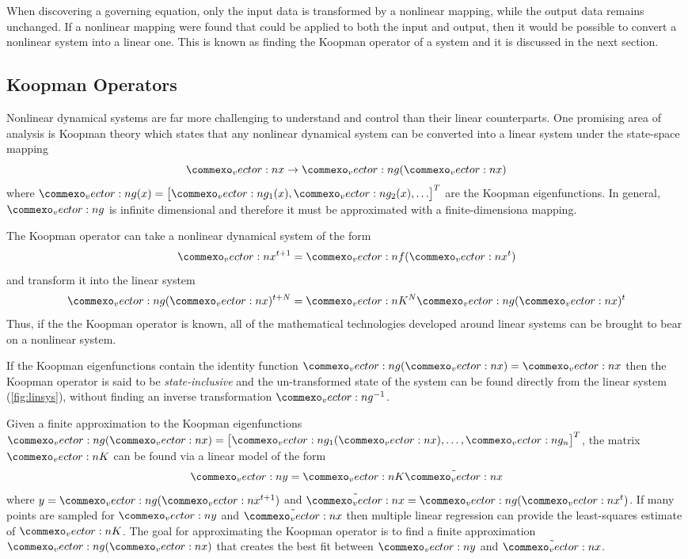 \documentclass{article}
\renewcommand{\vec}[1]{\vect{#1}}
\newcommand{\mat}[1]{\vect{#1}}
\begin{document}
When discovering a governing equation, only the input data is transformed by a nonlinear mapping, while the output data remains unchanged. If a nonlinear mapping were found that could be applied to both the input and output, then it would be possible to convert a nonlinear system into a linear one. This is known as finding the Koopman operator of a system and it is discussed in the next section.

\subsection{Koopman Operators}
Nonlinear dynamical systems are far more challenging to understand and control than their linear counterparts. One promising area of analysis is Koopman theory \cite{korda2018linear} which states that any nonlinear dynamical system can be converted into a linear system under the state-space mapping
\begin{equation}
\vec{x} \rightarrow \vec{g}(\vec{x})
\end{equation}
where $\vec{g}(x) = \begin{bmatrix} \vec{g}_1(x), \vec{g}_2(x), \ldots \end{bmatrix}^T$ are the Koopman eigenfunctions. In general, $\vec{g}$ is infinite dimensional and therefore it must be approximated with a finite-dimensiona mapping.

The Koopman operator can take a nonlinear dynamical system of the form
\begin{equation}
\vec{x}^{t+1} = \vec{f}(\vec{x}^t)
\end{equation}
and transform it into the linear system
\begin{equation}
\label{fig:linsys}
\vec{g}(\vec{x})^{t+N} = \mat{K}^N \vec{g}(\vec{x})^{t}
\end{equation}
Thus, if the the Koopman operator is known, all of the mathematical technologies developed around linear systems can be brought to bear on a nonlinear system. 

If the Koopman eigenfunctions contain the identity function $\vec{g}(\vec{x}) = \vec{x}$ then the Koopman operator is said to be \emph{state-inclusive} and the un-transformed state of the system can be found directly from the linear system (\cref{fig:linsys}), without finding an inverse transformation $\vec{g}^{-1}$.

Given a finite approximation to the Koopman eigenfunctions $\vec{g}(\vec{x}) = \begin{bmatrix} \vec{g}_1(\vec{x}), \ldots, \vec{g}_n \end{bmatrix}^T$, the matrix $\mat{K}$ can be found via a linear model of the form 
\begin{equation}
\vec{y} = \mat{K} \tilde{\vec{x}}
\end{equation} 
where $y = \vec{g}(\vec{x}^{t+1})$ and $\tilde{\vec{x}} = \vec{g}(\vec{x}^t)$. If many points are sampled for $\vec{y}$ and $\tilde{\vec{x}}$ then multiple linear regression can provide the least-squares estimate of $\mat{K}$. The goal for approximating the Koopman operator is to find a finite approximation $\vec{g}(\vec{x})$ that creates the best fit between $\vec{y}$ and $\tilde{\vec{x}}$.
\end{document}
